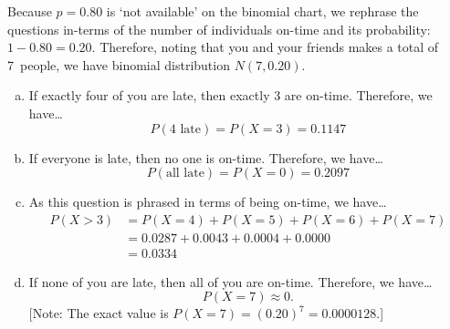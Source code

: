 \documentclass[11pt,letterpaper]{article}
\begin{document}
\sol Because $p= 0.80$ is `not available' on the binomial chart, we rephrase the questions in-terms of the number of individuals on-time and its probability: $1 - 0.80= 0.20$. Therefore, noting that you and your friends makes a total of 7~people, we have binomial distribution $N(7, 0.20)$. 

\begin{enumerate}[(a)]
\item If exactly four of you are late, then exactly 3 are on-time. Therefore, we have\dots
	\[
	P(4 \text{ late})= P(X= 3)= 0.1147
	\] \pspace

\item If everyone is late, then no one is on-time. Therefore, we have\dots
	\[
	P(\text{all late})= P(X= 0)= 0.2097
	\] \pspace

\item As this question is phrased in terms of being on-time, we have\dots
	\[
	\begin{aligned}
	P(X > 3)&= P(X= 4) + P(X= 5) + P(X= 6) + P(X= 7) \\[0.3cm]
	&= 0.0287 + 0.0043 + 0.0004 + 0.0000 \\[0.3cm]
	&= 0.0334
	\end{aligned}
	\] \pspace

\item If none of you are late, then all of you are on-time. Therefore, we have\dots 
	\[
	P(X= 7) \approx 0.
	\]
[Note: The exact value is $P(X= 7)= (0.20)^7= 0.0000128$.]
\end{enumerate}
\end{document}
